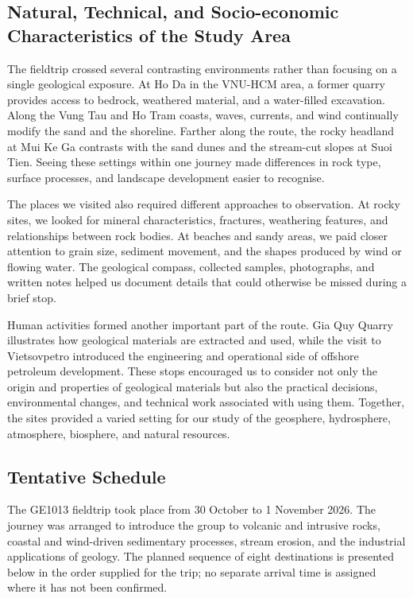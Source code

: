 \documentclass[11pt, a4paper]{article}
\begin{document}
\subsection{Natural, Technical, and Socio-economic Characteristics of the Study Area}
The fieldtrip crossed several contrasting environments rather than focusing on a single geological exposure. At Ho Da in the VNU-HCM area, a former quarry provides access to bedrock, weathered material, and a water-filled excavation. Along the Vung Tau and Ho Tram coasts, waves, currents, and wind continually modify the sand and the shoreline. Farther along the route, the rocky headland at Mui Ke Ga contrasts with the sand dunes and the stream-cut slopes at Suoi Tien. Seeing these settings within one journey made differences in rock type, surface processes, and landscape development easier to recognise.

The places we visited also required different approaches to observation. At rocky sites, we looked for mineral characteristics, fractures, weathering features, and relationships between rock bodies. At beaches and sandy areas, we paid closer attention to grain size, sediment movement, and the shapes produced by wind or flowing water. The geological compass, collected samples, photographs, and written notes helped us document details that could otherwise be missed during a brief stop.

Human activities formed another important part of the route. Gia Quy Quarry illustrates how geological materials are extracted and used, while the visit to Vietsovpetro introduced the engineering and operational side of offshore petroleum development. These stops encouraged us to consider not only the origin and properties of geological materials but also the practical decisions, environmental changes, and technical work associated with using them. Together, the sites provided a varied setting for our study of the geosphere, hydrosphere, atmosphere, biosphere, and natural resources.

\subsection{Tentative Schedule}
The GE1013 fieldtrip took place from 30 October to 1 November 2026. The journey was arranged to introduce the group to volcanic and intrusive rocks, coastal and wind-driven sedimentary processes, stream erosion, and the industrial applications of geology. The planned sequence of eight destinations is presented below in the order supplied for the trip; no separate arrival time is assigned where it has not been confirmed.
\end{document}
